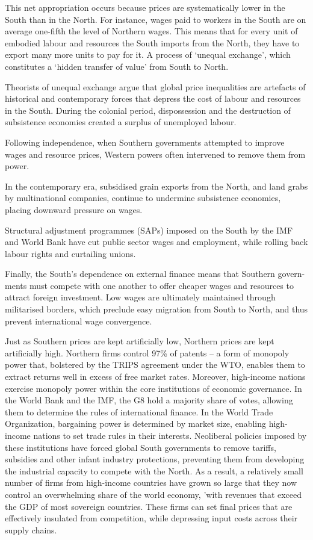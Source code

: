 \documentclass[
]{book}
\begin{document}
This net appropriation occurs because prices are
systematically lower in the South than in the North.
For instance, wages paid to workers in the South are on average
one-fifth the level of Northern wages.
This means that for every unit of embodied labour and resources the South
imports from the North, they have to export many more units to pay for it.
A process of `unequal exchange', which constitutes a `hidden transfer of
value' from South to North.

Theorists of unequal exchange argue that global price inequalities are
artefacts of historical and contemporary forces that
depress the cost of labour and resources in the South.
During the colonial period, dispossession and the
destruction of subsistence economies created a surplus of unemployed labour.

Following independence, when Southern governments attempted to improve
wages and resource prices, Western powers often intervened to remove them from power.

In the contemporary era, subsidised grain exports from the North, and
land grabs by multinational companies, continue to undermine subsistence
economies, placing downward pressure on wages.

Structural adjustment programmes (SAPs) imposed on the South
by the IMF and World Bank have cut public sector wages and employment,
while rolling back labour rights and curtailing unions.

Finally, the South's dependence on external finance means that Southern govern-
ments must compete with one another to offer cheaper wages and resources to attract foreign
investment.
Low wages are ultimately maintained through militarised borders,
which preclude easy migration from South to North, and thus prevent international wage
convergence.

Just as Southern prices are kept artificially low, Northern prices are kept
artificially high.
Northern firms control 97\% of patents -- a form of monopoly power that,
bolstered by the TRIPS agreement under the WTO, enables them to
extract returns well in excess of free market rates.
Moreover, high-income nations exercise monopoly power within the core institutions
of economic governance.
In the World Bank and the IMF, the G8 hold a majority share of votes, allowing
them to determine the rules of international finance.
In the World Trade Organization, bargaining power is determined by market size,
enabling high-income nations to set trade rules in their interests.
Neoliberal policies imposed by these institutions have forced
global South governments to remove tariffs, subsidies and other infant industry protections,
preventing them from developing the industrial capacity to compete with the North.
As a result, a relatively small number of firms from high-income countries
have grown so large that they now control an overwhelming share of the world economy,
'with revenues that exceed the GDP of most sovereign countries.
These firms can set final prices that are effectively insulated from competition,
while depressing input costs across their supply chains.
\end{document}
